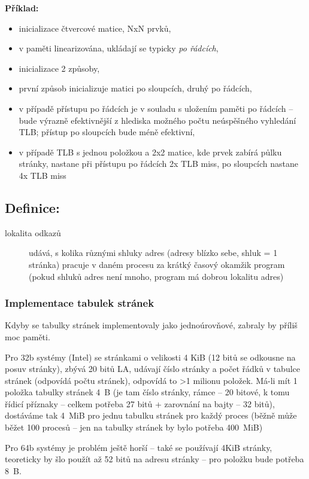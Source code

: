 \documentclass[a4paper, 11pt]{article}
\begin{document}
\textbf{Příklad:}
\begin{itemize}
    \item inicializace čtvercové matice, NxN prvků,
    \item v paměti linearizována, ukládají se typicky \emph{po řádcích},
    \item inicializace 2 způsoby,
    \item první způsob inicializuje matici po sloupcích, druhý po řádcích,
    \item v případě přístupu po řádcích je v souladu s uložením paměti po řádcích -- bude výrazně efektivnější z hlediska možného počtu neúspěšného vyhledání TLB; přístup po sloupcích bude méně efektivní,
    \item v případě TLB s jednou položkou a 2x2 matice, kde prvek zabírá půlku stránky, nastane při přístupu po řádcích 2x TLB miss, po sloupcích nastane 4x TLB miss
\end{itemize}
 
\subsection*{Definice:}
\begin{description}
\item[lokalita odkazů] udává, s kolika různými shluky adres (adresy blízko sebe, shluk = 1 stránka) pracuje v daném procesu za krátký časový okamžik program (pokud shluků adres není mnoho, program má dobrou lokalitu adres)
\end{description}

\subsubsection{Implementace tabulek stránek}
Kdyby se tabulky stránek implementovaly jako jednoúrovňové, zabraly by příliš moc paměti. 

Pro 32b systémy (Intel) se stránkami o velikosti 4 KiB (12 bitů se odkousne na posuv stránky), zbývá 20 bitů LA, udávají číslo stránky a počet řádků v tabulce stránek (odpovídá počtu stránek), odpovídá to >1 milionu položek. Má-li mít 1 položka tabulky stránek 4~B (je tam číslo stránky, rámce -- 20 bitové, k tomu řídicí příznaky -- celkem potřeba 27 bitů + zarovnání na bajty -- 32 bitů), dostáváme tak 4~MiB pro jednu tabulku stránek pro každý proces (běžně může běžet 100 procesů -- jen na tabulky stránek by bylo potřeba 400~MiB)
 
Pro 64b systémy je problém ještě horší -- také se používají 4KiB stránky, teoreticky by šlo použít až 52 bitů na adresu stránky -- pro položku bude potřeba 8~B.
 
\end{document}
